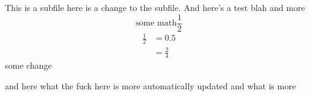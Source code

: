 \documentclass[../main.tex]{subfiles}
\begin{document}
This is a subfile here is a change to the subfile. And here's a test blah and more
\[ \text{some math} \frac{1}{2} \]
\begin{align}
\frac{1}{2} &= 0.5 \\
&= \frac{2}{4} 
\end{align}
some change

and here what the fuck
here is more automatically updated 
and what is more
\end{document}
